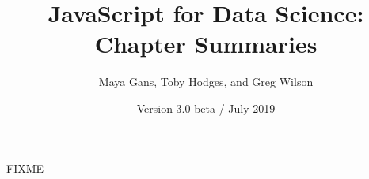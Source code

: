 \documentclass{article}
\begin{document}
\title{JavaScript for Data Science: Chapter Summaries}
\author{Maya Gans, Toby Hodges, and Greg Wilson}
\date{Version 3.0 beta / July 2019}
\maketitle

FIXME
\end{document}
